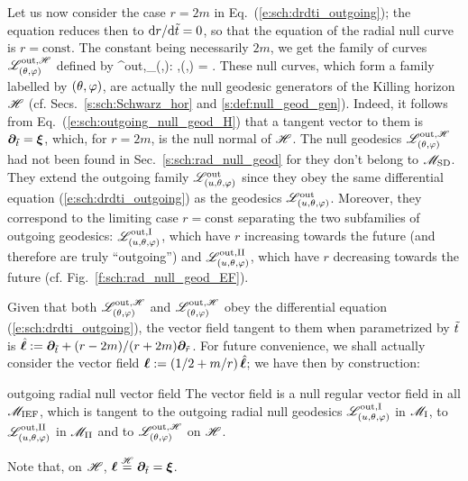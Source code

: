 Let us now consider the case $r=2m$ in
Eq.~(\ref{e:sch:drdti_outgoing}); the equation
reduces then to
$\mathrm{d} r / \mathrm{d} {\tilde t} = 0$, so that the equation of the radial null curve is
$r = \mathrm{const}$. The constant being necessarily $2m$, we get
the family of curves $\mathscr{L}^{{\rm out},\mathscr{H}}_{(\theta,\varphi)}$
defined by
\be \label{e:sch:outgoing_null_geod_H}
    \Li^{{\rm out},\Hor}_{(\th,\ph)}:\quad {} ,\quad (\th,\ph) = .
\ee
These null curves, which form a family labelled by $(\theta,\varphi)$, are actually
the null geodesic generators of the Killing horizon $\mathscr{H}$ (cf. Secs.~\ref{s:sch:Schwarz_hor}
and \ref{s:def:null_geod_gen}).
Indeed, it follows from Eq.~(\ref{e:sch:outgoing_null_geod_H}) that a tangent
vector to them is $\bm{\partial}_{{\tilde t}} = \bm{\xi}$, which, for $r=2m$, is the null normal of $\mathscr{H}$.
The null geodesics $\mathscr{L}^{{\rm out},\mathscr{H}}_{(\theta,\varphi)}$ had not been found in
Sec.~\ref{s:sch:rad_null_geod} for they don't belong to $\mathscr{M}_{\rm SD}$.
They extend the outgoing family $\mathscr{L}^{\rm out}_{(u,\theta,\varphi)}$
since they obey the same differential equation (\ref{e:sch:drdti_outgoing})
as the
geodesics $\mathscr{L}^{\rm out}_{(u,\theta,\varphi)}$. Moreover, they correspond
to the limiting case $r = \mathrm{const}$ separating the two subfamilies of outgoing
geodesics: $\mathscr{L}^{\rm out,I}_{(u,\theta,\varphi)}$, which have $r$ increasing
towards the future (and therefore are truly ``outgoing'') and $\mathscr{L}^{\rm out,II}_{(u,\theta,\varphi)}$,
which have $r$ decreasing towards the future (cf. Fig.~\ref{f:sch:rad_null_geod_EF}).

Given that both $\mathscr{L}^{{\rm out},\mathscr{H}}_{(\theta,\varphi)}$ and $\mathscr{L}^{{\rm out},\mathscr{H}}_{(\theta,\varphi)}$
obey the differential equation (\ref{e:sch:drdti_outgoing}), the vector field
tangent to them when parametrized by ${\tilde t}$ is
$\hat{\bm{\ell}} := \bm{\partial}_{{\tilde t}} +  (r - 2m)/(r + 2m) \bm{\partial}_{\tilde r}$.
For future convenience, we shall actually consider the vector field
$\bm{\ell} := (1/2 + m/r) \, \hat{\bm{\ell}}$; we have then by construction:
\begin{tprop}{outgoing radial null vector field}{}
The vector field
\be \label{e:sch:null_vector_ell}
\ee
is a null regular vector field in all $\mathscr{M}_{\rm IEF}$, which is tangent to the outgoing radial
null geodesics $\mathscr{L}^{\rm out,I}_{(u,\theta,\varphi)}$ in $\mathscr{M}_{\rm I}$,
to $\mathscr{L}^{\rm out,II}_{(u,\theta,\varphi)}$ in $\mathscr{M}_{\rm II}$
and to $\mathscr{L}^{{\rm out},\mathscr{H}}_{(\theta,\varphi)}$ on $\mathscr{H}$.
\end{tprop}
Note that, on $\mathscr{H}$, $\bm{\ell} \stackrel{\mathscr{H}}{=} \bm{\partial}_{{\tilde t}} = \bm{\xi}$.

